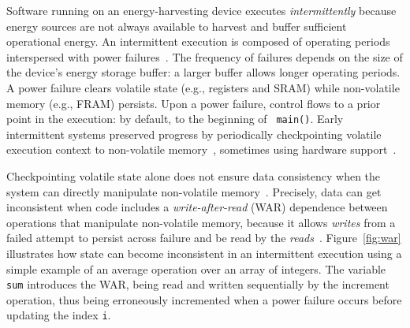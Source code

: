 Software running on an energy-harvesting device executes {\em intermittently}
because energy sources are not always available to harvest and buffer
sufficient operational energy. An intermittent execution is composed of
operating periods interspersed with power
failures~\cite{dino,chain,alpaca,ratchet}. The frequency of failures depends on
the size of the device's energy storage buffer: a larger buffer allows longer
operating periods. 
A power failure clears volatile state (e.g., registers and SRAM) while
non-volatile memory (e.g., FRAM) persists. Upon a power failure, control flows
to a prior point in the execution: by default, to the beginning of {\tt
main()}. Early intermittent systems preserved progress by periodically
checkpointing volatile execution context to non-volatile
memory~\cite{mementos}, sometimes using hardware
support~\cite{mottola2017harvos,hibernusplusplus,hibernus,idetic,quickrecall}. 


Checkpointing volatile state alone does not ensure data consistency when the
system can directly manipulate non-volatile memory~\cite{mspcdino}.
Precisely, data can get inconsistent when code includes a
\emph{write-after-read} (WAR) dependence between operations that manipulate
non-volatile memory, because it allows {\em writes} from a failed attempt to
persist across failure and be read by the {\em
reads}~\cite{ratchet,dino,alpaca}.
Figure~\ref{fig:war} illustrates how state can become
inconsistent in an intermittent execution using a simple example of an average
operation over an array of integers.
The variable \texttt{sum} introduces the WAR, being read and written sequentially
by the increment operation, thus being erroneously incremented when a power
failure occurs before updating the index \texttt{i}.

